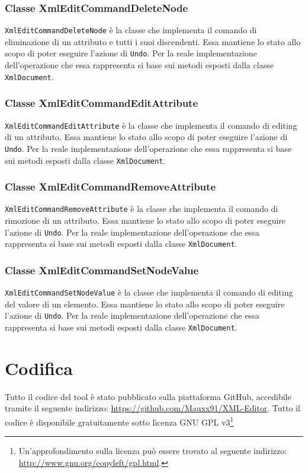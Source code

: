 	\subsubsection{Classe XmlEditCommandDeleteNode}
		\texttt{XmlEditCommandDeleteNode} è la classe che implementa il comando di eliminazione di un attributo e tutti i suoi discendenti. Essa mantiene lo stato allo scopo di poter eseguire l'azione di \texttt{Undo}. Per la reale implementazione dell'operazione che essa rappresenta si base sui metodi esposti dalla classe \texttt{XmlDocument}.
		
	\subsubsection{Classe XmlEditCommandEditAttribute}
		\texttt{XmlEditCommandEditAttribute} è la classe che implementa il comando di editing di un attributo. Essa mantiene lo stato allo scopo di poter eseguire l'azione di \texttt{Undo}. Per la reale implementazione dell'operazione che essa rappresenta si base sui metodi esposti dalla classe \texttt{XmlDocument}.
		
	\subsubsection{Classe XmlEditCommandRemoveAttribute}
		\texttt{XmlEditCommandRemoveAttribute} è la classe che implementa il comando di rimozione di un attributo. Essa mantiene lo stato allo scopo di poter eseguire l'azione di \texttt{Undo}. Per la reale implementazione dell'operazione che essa rappresenta si base sui metodi esposti dalla classe \texttt{XmlDocument}.
		
	\subsubsection{Classe XmlEditCommandSetNodeValue}
		\texttt{XmlEditCommandSetNodeValue} è la classe che implementa il comando di editing del valore di un elemento. Essa mantiene lo stato allo scopo di poter eseguire l'azione di \texttt{Undo}. Per la reale implementazione dell'operazione che essa rappresenta si base sui metodi esposti dalla classe \texttt{XmlDocument}.












\section{Codifica}
Tutto il codice del tool è stato pubblicato sulla piattaforma GitHub, accedibile tramite il seguente indirizzo: \url{https://github.com/Mauxx91/XML-Editor}. Tutto il codice è disponibile gratuitamente sotto licenza GNU GPL v3\footnote{Un'approfondimento sulla licenza può essere trovato al seguente indirizzo: \url{http://www.gnu.org/copyleft/gpl.html}.}\\

